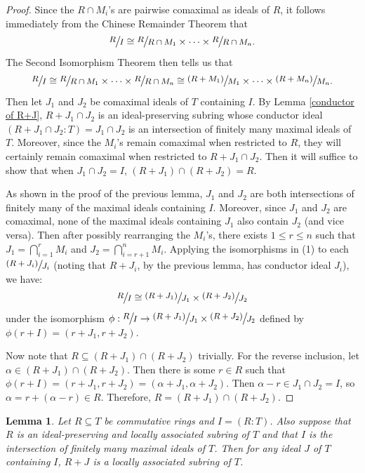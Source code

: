 \documentclass[12pt]{amsart}
\newtheorem{lemma}[theorem]{Lemma}
\theoremstyle{definition}
\newcommand{\quot}[2]{\large\sfrac{#1}{#2}\normalsize}
\begin{document}
\begin{proof}
    Since the $R\cap M_i$'s are pairwise comaximal as ideals of $R$, it follows immediately from the Chinese Remainder Theorem that
    $$\quot{R}{I}\cong \quot{R}{R\cap M_1}\times\dots\times \quot{R}{R\cap M_n}.$$
    The Second Isomorphism Theorem then tells us that
    \begin{equation}\quot{R}{I}\cong\quot{R}{R\cap M_1}\times\dots\times \quot{R}{R\cap M_n}\cong \quot{(R+M_1)}{M_1}\times\dots\times \quot{(R+M_n)}{M_n}.\end{equation}
    Then let $J_1$ and $J_2$ be comaximal ideals of $T$ containing $I$. By Lemma \ref{conductor of R+J}, $R+J_1\cap J_2$ is an ideal-preserving subring whose conductor ideal $(R+J_1\cap J_2:T)=J_1\cap J_2$ is an intersection of finitely many maximal ideals of $T$. Moreover, since the $M_i$'s remain comaximal when restricted to $R$, they will certainly remain comaximal when restricted to $R+J_1\cap J_2$. Then it will suffice to show that when $J_1\cap J_2=I$, $(R+J_1)\cap (R+J_2)=R$.
    
    As shown in the proof of the previous lemma, $J_1$ and $J_2$ are both intersections of finitely many of the maximal ideals containing $I$. Moreover, since $J_1$ and $J_2$ are comaximal, none of the maximal ideals containing $J_1$ also contain $J_2$ (and vice versa). Then after possibly rearranging the $M_i$'s, there exists $1\leq r\leq n$ such that $J_1=\bigcap_{i=1}^r M_i$ and $J_2=\bigcap_{i=r+1}^n M_i$. Applying the isomorphisms in (1) to each $\quot{(R+J_i)}{J_i}$ (noting that $R+J_i$, by the previous lemma, has conductor ideal $J_i$), we have:
    $$\quot{R}{I}\cong \quot{(R+J_1)}{J_1}\times \quot{(R+J_2)}{J_2}$$
    under the isomorphism $\phi:\quot{R}{I}\to \quot{(R+J_1)}{J_1}\times \quot{(R+J_2)}{J_2}$ defined by $\phi(r+I)=(r+J_1,r+J_2)$.

    Now note that $R\subseteq (R+J_1)\cap (R+J_2)$ trivially. For the reverse inclusion, let $\alpha\in (R+J_1)\cap (R+J_2)$. Then there is some $r\in R$ such that $\phi(r+I)=(r+J_1,r+J_2)=(\alpha+J_1,\alpha+J_2)$. Then $\alpha-r\in J_1\cap J_2=I$, so $\alpha=r+(\alpha-r)\in R$. Therefore, $R=(R+J_1)\cap (R+J_2)$.
\end{proof}

\begin{lemma}
    \label{la in towers}
    Let $R\subseteq T$ be commutative rings and $I=(R:T)$. Also suppose that $R$ is an ideal-preserving and locally associated subring of $T$ and that $I$ is the intersection of finitely many maximal ideals of $T$. Then for any ideal $J$ of $T$ containing $I$, $R+J$ is a locally associated subring of $T$.
\end{lemma}
\end{document}
